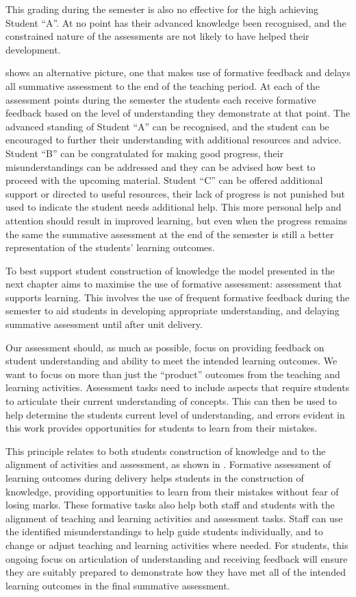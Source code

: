This grading during the semester is also no effective for the high achieving Student ``A''. At no point has their advanced knowledge been recognised, and the constrained nature of the assessments are not likely to have helped their development. 

 shows an alternative picture, one that makes use of formative feedback and delays all summative assessment to the end of the teaching period. At each of the assessment points during the semester the students each receive formative feedback based on the level of understanding they demonstrate at that point. The advanced standing of Student ``A'' can be recognised, and the student can be encouraged to further their understanding with additional resources and advice. Student ``B'' can be congratulated for making good progress, their misunderstandings can be addressed and they can be advised how best to proceed with the upcoming material. Student ``C'' can be offered additional support or directed to useful resources, their lack of progress is not punished but used to indicate the student needs additional help. This more personal help and attention should result in improved learning, but even when the progress remains the same the summative assessment at the end of the semester is still a better representation of the students' learning outcomes.

\bigskip

To best support student construction of knowledge the model presented in the next chapter aims to maximise the use of formative assessment: assessment that supports learning. This involves the use of frequent formative feedback during the semester to aid students in developing appropriate understanding, and delaying summative assessment until after unit delivery.

Our assessment should, as much as possible, focus on providing feedback on student understanding and ability to meet the intended learning outcomes. We want to focus on more than just the ``product'' outcomes from the teaching and learning activities. Assessment tasks need to include aspects that require students to articulate their current understanding of concepts. This can then be used to help determine the students current level of understanding, and errors evident in this work provides opportunities for students to learn from their mistakes. 

This principle relates to both students construction of knowledge and to the alignment of activities and assessment, as shown in . Formative assessment of learning outcomes during delivery helps students in the construction of knowledge, providing opportunities to learn from their mistakes without fear of losing marks. These formative tasks also help both staff and students with the alignment of teaching and learning activities and assessment tasks. Staff can use the identified misunderstandings to help guide students individually, and to change or adjust teaching and learning activities where needed. For students, this ongoing focus on articulation of understanding and receiving feedback will ensure they are suitably prepared to demonstrate how they have met all of the intended learning outcomes in the final summative assessment.

